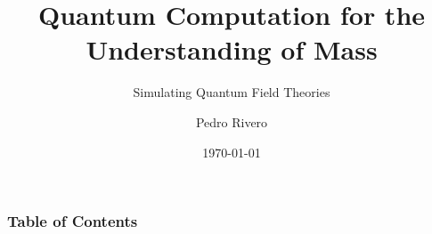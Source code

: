 \documentclass[9pt, handout, aspectratio=169]{beamer}	%
\title{Quantum Computation for the Understanding of Mass}
\subtitle{Simulating Quantum Field Theories}
\author{Pedro Rivero}
\institute{Illinois Institute of Technology \\ Argonne National Laboratory}
\date{\today}
\begin{document}
	\justify
	\setlength{\abovedisplayskip}{0pt}
	\setlength{\belowdisplayskip}{12pt}
	\setlength{\abovedisplayshortskip}{0pt}
	\setlength{\belowdisplayshortskip}{12pt}

\begin{frame}[plain,t]
	\titlepage
\end{frame}

\begin{frame}
  \frametitle{Table of Contents}
  \begin{multicols}{2}
    \tableofcontents%
  \end{multicols}
\end{frame}














%
%
%
\end{document}
